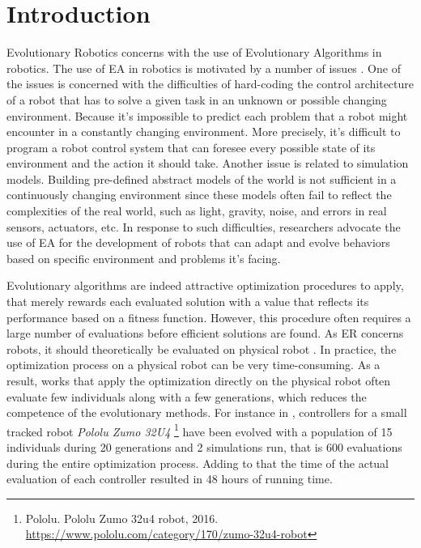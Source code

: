 \chapter{Introduction}

Evolutionary Robotics concerns with the use of Evolutionary Algorithms in robotics. The use of EA in robotics is motivated by a number of issues . One of the issues is concerned with the difficulties of hard-coding the control architecture of a robot that has to solve a given task in an unknown or possible changing environment. Because it's impossible to predict each problem that a robot might encounter in a constantly changing environment. More precisely, it's difficult to program a robot control system that can foresee every possible state of its environment and the action it should take.  Another issue is related to simulation models. Building pre-defined abstract models of the world is not sufficient in a continuously changing environment since these models often fail to reflect the complexities of the real world, such as light, gravity, noise, and errors in real sensors, actuators, etc. In response to such difficulties, researchers advocate the use of EA for the development of robots that can adapt and evolve behaviors based on specific environment and problems it's facing.

Evolutionary algorithms are indeed attractive optimization procedures to apply, that merely rewards each evaluated solution with a value that reflects its performance based on a fitness function. However, this procedure often requires a large number of evaluations before efficient solutions are found. As ER concerns robots, it should theoretically be evaluated on physical robot \citep{floreano1998evolutionary}. In practice, the optimization process on a physical robot can be very time-consuming. As a result, works that apply the optimization directly on the physical robot often evaluate few individuals along with a few generations, which reduces the competence of the evolutionary methods. For instance in \citep{faina2017automating}, controllers for a small tracked robot \textit{Pololu Zumo 32U4} \footnote{Pololu. Pololu Zumo 32u4 robot, 2016. \url{https://www.pololu.com/category/170/zumo-32u4-robot}} have been evolved with a population of 15 individuals during 20 generations and 2 simulations run, that is 600 evaluations during the entire optimization process. Adding to that the time of the actual evaluation of each controller resulted in 48 hours of running time.

